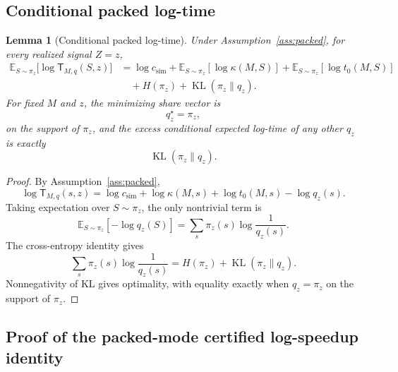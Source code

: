 \documentclass{article}
\newtheorem{lemma}{Lemma}
\DeclareMathOperator{\KL}{KL}
\newcommand{\E}{\mathbb{E}}
\begin{document}
\subsection{Conditional packed log-time}

\begin{lemma}[Conditional packed log-time]
\label{lem:app-conditional-packed}
Under Assumption~\ref{ass:packed}, for every realized signal \(Z=z\),
\[
\begin{aligned}
    \E_{S\sim\pi_z}
    \bigl[
        \log \mathsf T_{M,q}(S,z)
    \bigr]
    &=
    \log c_{\mathrm{sim}}
    +
    \E_{S\sim\pi_z}[\log\kappa(M,S)]
    +
    \E_{S\sim\pi_z}[\log t_0(M,S)]
    \\
    &\quad
    +
    H(\pi_z)
    +
    \KL(\pi_z\|q_z).
\end{aligned}
\]
For fixed \(M\) and \(z\), the minimizing share vector is
\[
    q_z^\star=\pi_z,
\]
on the support of \(\pi_z\), and the excess conditional expected log-time of any other
\(q_z\) is exactly
\[
    \KL(\pi_z\|q_z).
\]
\end{lemma}

\begin{proof}
By Assumption~\ref{ass:packed},
\[
    \log \mathsf T_{M,q}(s,z)
    =
    \log c_{\mathrm{sim}}
    +
    \log\kappa(M,s)
    +
    \log t_0(M,s)
    -
    \log q_z(s).
\]
Taking expectation over \(S\sim\pi_z\), the only nontrivial term is
\[
    \E_{S\sim\pi_z}[-\log q_z(S)]
    =
    \sum_s \pi_z(s)\log\frac{1}{q_z(s)}.
\]
The cross-entropy identity gives
\[
    \sum_s \pi_z(s)\log\frac{1}{q_z(s)}
    =
    H(\pi_z)+\KL(\pi_z\|q_z).
\]
Nonnegativity of KL gives optimality, with equality exactly when \(q_z=\pi_z\) on the
support of \(\pi_z\).
\end{proof}

\subsection{Proof of the packed-mode certified log-speedup identity}
\end{document}
